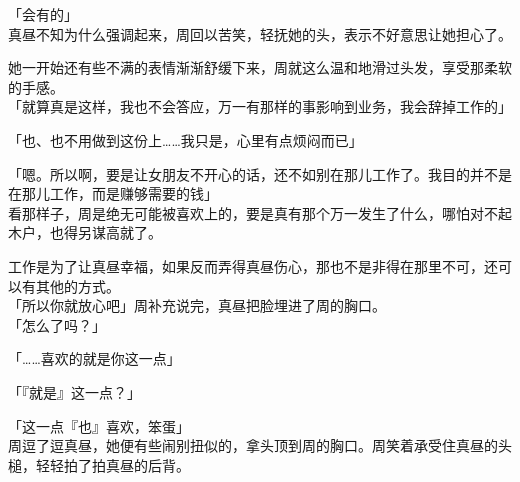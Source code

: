 「会有的」\\

真昼不知为什么强调起来，周回以苦笑，轻抚她的头，表示不好意思让她担心了。

她一开始还有些不满的表情渐渐舒缓下来，周就这么温和地滑过头发，享受那柔软的手感。\\

「就算真是这样，我也不会答应，万一有那样的事影响到业务，我会辞掉工作的」

「也、也不用做到这份上……我只是，心里有点烦闷而已」

「嗯。所以啊，要是让女朋友不开心的话，还不如别在那儿工作了。我目的并不是在那儿工作，而是赚够需要的钱」\\

看那样子，周是绝无可能被喜欢上的，要是真有那个万一发生了什么，哪怕对不起木户，也得另谋高就了。

工作是为了让真昼幸福，如果反而弄得真昼伤心，那也不是非得在那里不可，还可以有其他的方式。\\

「所以你就放心吧」周补充说完，真昼把脸埋进了周的胸口。\\

「怎么了吗？」

「……喜欢的就是你这一点」

「『就是』这一点？」

「这一点『也』喜欢，笨蛋」\\

周逗了逗真昼，她便有些闹别扭似的，拿头顶到周的胸口。周笑着承受住真昼的头槌，轻轻拍了拍真昼的后背。
